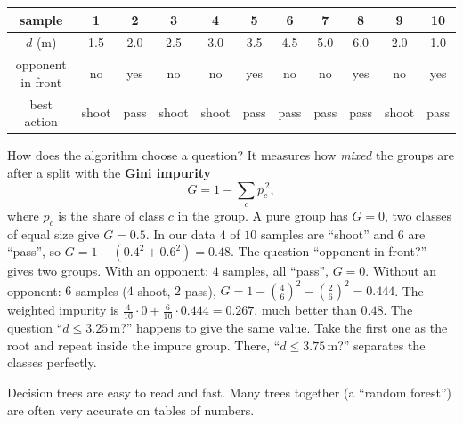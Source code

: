 \begin{center}
\renewcommand{\arraystretch}{1.15}
\begin{tabular}{c|cccccccccc}
sample & 1 & 2 & 3 & 4 & 5 & 6 & 7 & 8 & 9 & 10\\ \hline
$d$ (m) & 1.5 & 2.0 & 2.5 & 3.0 & 3.5 & 4.5 & 5.0 & 6.0 & 2.0 & 1.0\\
opponent in front & no & yes & no & no & yes & no & no & yes & no & yes\\
best action & shoot & pass & shoot & shoot & pass & pass & pass & pass & shoot & pass
\end{tabular}
\end{center}
How does the algorithm choose a question? It measures how \emph{mixed} the groups are after a split with the \textbf{Gini impurity}
\[
G=1-\sum_{c}p_c^{\,2},
\]
where $p_c$ is the share of class $c$ in the group. A pure group has $G=0$, two classes of equal size give $G=0.5$. In our data $4$ of $10$ samples are ``shoot'' and $6$ are ``pass'', so $G=1-(0.4^2+0.6^2)=0.48$. The question ``opponent in front?'' gives two groups. With an opponent: $4$ samples, all ``pass'', $G=0$. Without an opponent: $6$ samples ($4$ shoot, $2$ pass), $G=1-(\frac46)^2-(\frac26)^2=0.444$. The weighted impurity is $\frac{4}{10}\cdot0+\frac{6}{10}\cdot0.444=0.267$, much better than $0.48$. The question ``$d\le3.25$\,m?'' happens to give the same value. Take the first one as the root and repeat inside the impure group. There, ``$d\le3.75$\,m?'' separates the classes perfectly.

\begin{center}
\label{fig:ai1_tree}
\end{center}
Decision trees are easy to read and fast. Many trees together (a ``random forest'') are often very accurate on tables of numbers.

